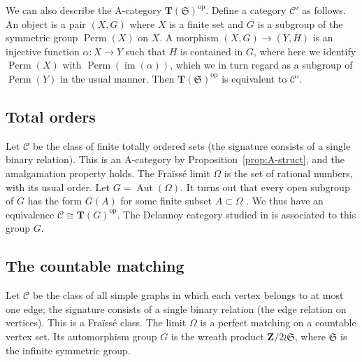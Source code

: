 \documentclass[12pt]{amsart}
\newcommand{\Acom}[1]{\textcolor{blue}{[#1]}}
\numberwithin{equation}{section}
\newtheorem{proposition}[equation]{Proposition}
\theoremstyle{definition}
\newcommand{\cA}{\mathcal{A}}
\newcommand{\rA}{\mathrm{A}}
\newcommand{\cC}{\mathcal{C}}
\newcommand{\cE}{\mathcal{E}}
\newcommand{\fS}{\mathfrak{S}}
\newcommand{\bT}{\mathbf{T}}
\newcommand{\bZ}{\mathbf{Z}}
\DeclareMathOperator{\im}{im}
\DeclareMathOperator{\Aut}{Aut}
\newcommand{\op}{\mathrm{op}}
\DeclareMathOperator{\Perm}{Perm}
\begin{document}
We can also describe the $\rA$-category $\bT(\fS)^{\op}$. Define a category $\cC'$ as follows. An object is a pair $(X,G)$ where $X$ is a finite set and $G$ is a subgroup of the symmetric group $\Perm(X)$ on $X$. A morphism $(X,G) \to (Y,H)$ is an injective function $\alpha \colon X \to Y$ such that $H$ is contained in $G$, where here we identify $\Perm(X)$ with $\Perm(\im(\alpha))$, which we in turn regard as a subgroup of $\Perm(Y)$ in the usual manner. Then $\bT(\fS)^{\op}$ is equivalent to $\cC'$.

%

\subsection{Total orders} \label{ss:tot-ord}

Let $\cC$ be the class of finite totally ordered sets (the signature consists of a single binary relation). This is an $\rA$-category by Proposition~\ref{prop:A-struct}, and the amalgamation property holds. The Fra\"iss\'e limit $\Omega$ is the set of rational numbers, with its usual order. Let $G=\Aut(\Omega)$. It turns out that every open subgroup of $G$ has the form $G(A)$ for some finite subset $A \subset \Omega$ \cite[Proposition~17.1]{repst}. We thus have an equivalence $\cC \cong \bT(G)^{\op}$. The Delannoy category studied in \cite{line} is associated to this group $G$.

\subsection{The countable matching} \label{ss:matching}

Let $\cC$ be the class of all simple graphs in which each vertex belongs to at most one edge; the signature consists of a single binary relation (the edge relation on vertices). This is a Fra\"iss\'e class. The limit $\Omega$ is a perfect matching on a countable vertex set. Its automorphism group $G$ is the wreath product $\bZ/2 \wr \fS$, where $\fS$ is the infinite symmetric group.
\end{document}
